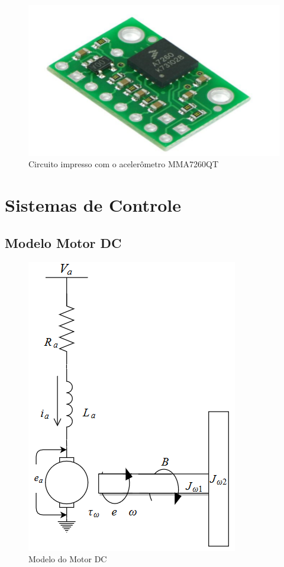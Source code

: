 \begin{figure}[H]
  \caption{Circuito impresso com o acelerômetro MMA7260QT}
  \begin{center}
      \includegraphics[scale=.4]{img/pci_acelerometro_calache_p22}
  \end{center}
  \label{fig:pci_acelerometro_calache_p22}
\end{figure}

\section{Sistemas de Controle}

\subsection{Modelo Motor DC}
\begin{figure}[H]
  \caption{Modelo do Motor DC}
  \begin{center}
      \includegraphics[scale=.65]{img/modelo_motor_dc}
  \end{center}
  \label{fig:modelo_motor_dc}
\end{figure}


